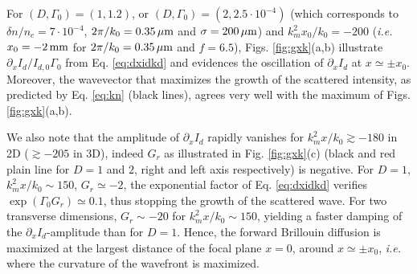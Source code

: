 \documentclass[
 reprint,
 amsmath,amssymb,
 aps,
]{revtex4-1}
\begin{document}
For $(D,\Gamma_0)=(1,1.2)$,   or $(D,\Gamma_0)=(2,2.5\cdot 10^{-4} )$ (which corresponds to $\delta n/n_c =7\cdot 10^{-4}$, $2\pi/k_0=0.35\,\rm\mu m$ and $\sigma=200\,\rm\mu m$) and $k_m^2x_0/k_0= -200$ (\emph{i.e.} $x_0=-2 \,\rm mm$ for $2\pi/k_0=0.35\,\rm\mu m$ and $f=6.5$), Figs. \ref{fig:gxk}(a,b) illustrate $\partial_x I_d / I_{d,0} \Gamma_0$ from Eq. \eqref{eq:dxidkd} and evidences the oscillation of $\partial_x I_d$ at $x\simeq \pm x_0$. Moreover, the wavevector that maximizes the growth of the scattered intensity, as predicted by Eq. \eqref{eq:kn} (black lines), agrees very well with the maximum of Figs. \ref{fig:gxk}(a,b). 

We also note that the amplitude of $\partial_x I_d$ rapidly vanishes for $k_m^2 x/k_0\gtrsim -180$ in 2D ($\gtrsim -205$ in 3D), indeed $G_r$  as illustrated in  Fig. \ref{fig:gxk}(c) (black and red plain line for $D=1$ and $2$,  right and left axis respectively) is negative. For $D=1$,  $k_m^2 x/k_0\sim 150$, $G_r\simeq -2$,  the exponential factor of Eq. \eqref{eq:dxidkd} verifies $\exp(\Gamma_0G_r) \simeq 0.1$, thus stopping the growth of the scattered wave.  For two transverse dimensions, $G_r\sim -20 $ for $k_m^2 x/k_0\sim 150$, yielding a faster damping of the $\partial_x I_d$-amplitude than for $D=1$.
Hence, the forward Brillouin diffusion is maximized at the largest distance  of the focal plane $x=0$, around $x\simeq \pm x_0$, \emph{i.e.}  where the curvature of the wavefront is maximized.
\end{document}
